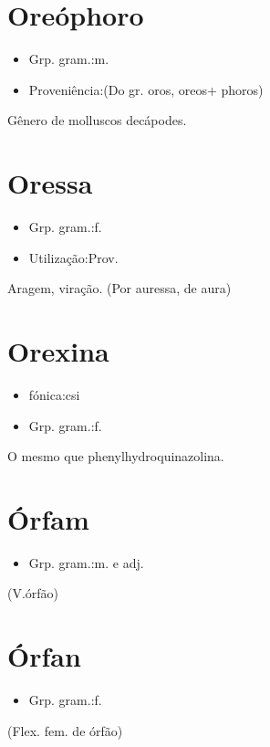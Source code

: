 \section{Oreóphoro}
\begin{itemize}
\item {Grp. gram.:m.}
\end{itemize}
\begin{itemize}
\item {Proveniência:(Do gr. \textunderscore oros\textunderscore , \textunderscore oreos\textunderscore  + \textunderscore phoros\textunderscore )}
\end{itemize}
Gênero de molluscos decápodes.
\section{Oressa}
\begin{itemize}
\item {Grp. gram.:f.}
\end{itemize}
\begin{itemize}
\item {Utilização:Prov.}
\end{itemize}
Aragem, viração.
(Por \textunderscore auressa\textunderscore , de \textunderscore aura\textunderscore )
\section{Orexina}
\begin{itemize}
\item {fónica:csi}
\end{itemize}
\begin{itemize}
\item {Grp. gram.:f.}
\end{itemize}
O mesmo que \textunderscore phenylhydroquinazolina\textunderscore .
\section{Órfam}
\begin{itemize}
\item {Grp. gram.:m.  e  adj.}
\end{itemize}
(V.órfão)
\section{Órfan}
\begin{itemize}
\item {Grp. gram.:f.}
\end{itemize}
(Flex. fem. de \textunderscore órfão\textunderscore )
